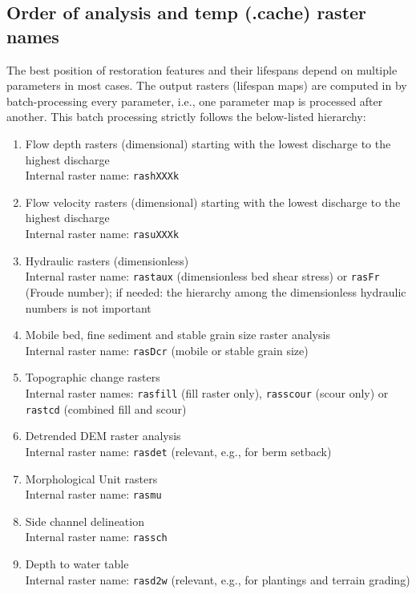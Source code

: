 \subsection{Order of analysis and temp (.cache) raster names}\label{sec:order}
The best position of restoration features and their lifespans depend on multiple parameters in most cases. The output rasters (lifespan maps) are computed in by batch-processing every parameter, i.e., one parameter map is processed after another. This batch processing strictly follows the below-listed hierarchy:
\begin{enumerate}
	\item Flow depth rasters (dimensional) starting with the lowest discharge to the highest discharge\\
	Internal raster name: \texttt{ras{\myUnderscore}hXXXk}
	\item Flow velocity rasters (dimensional) starting with the lowest discharge to the highest discharge\\
	Internal raster name: \texttt{ras{\myUnderscore}uXXXk}
	\item Hydraulic rasters (dimensionless)\\
	Internal raster name: \texttt{ras{\myUnderscore}taux} (dimensionless bed shear stress) or \texttt{ras{\myUnderscore}Fr} (Froude number); if needed: the hierarchy among the dimensionless hydraulic numbers is not important
	\item Mobile bed, fine sediment and stable grain size raster analysis\\
	Internal raster name: \texttt{ras{\myUnderscore}Dcr} (mobile or stable grain size) 
	\item Topographic change rasters\\
	Internal raster names: \texttt{ras{\myUnderscore}fill} (fill raster only), \texttt{ras{\myUnderscore}scour} (scour only) or \texttt{ras{\myUnderscore}tcd} (combined fill and scour)
	\item Detrended DEM raster analysis\\
	Internal raster name: \texttt{ras{\myUnderscore}det} (relevant, e.g., for berm setback)
	\item Morphological Unit rasters\\
	Internal raster name: \texttt{ras{\myUnderscore}mu}
	\item Side channel delineation\\
	Internal raster name: \texttt{ras{\myUnderscore}sch}
	\item Depth to water table\\
	Internal raster name: \texttt{ras{\myUnderscore}d2w} (relevant, e.g., for plantings and terrain grading)
\end{enumerate}

